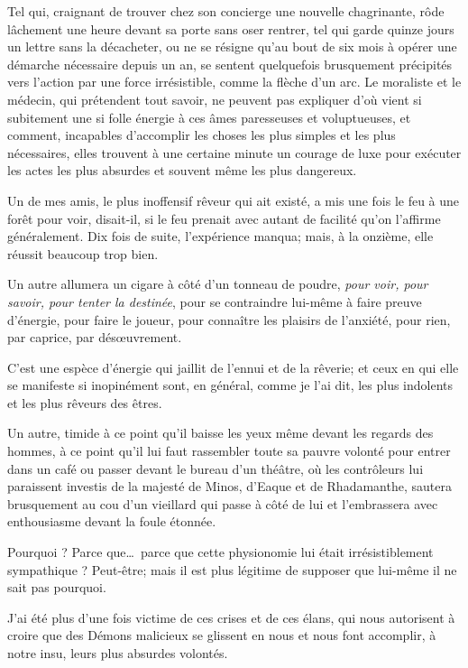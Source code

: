 Tel qui, craignant de trouver chez son concierge une nouvelle
chagrinante, rôde lâchement une heure devant sa porte sans oser
rentrer, tel qui garde quinze jours un lettre sans la décacheter, ou ne
se résigne qu’au bout de six mois à opérer une
démarche nécessaire depuis un an, se sentent quelquefois brusquement
précipités vers l’action par une force irrésistible,
comme la flèche d’un arc. Le moraliste et le médecin,
qui prétendent tout savoir, ne peuvent pas expliquer
d’où vient si subitement une si folle énergie à ces
âmes paresseuses et voluptueuses, et comment, incapables
d’accomplir les choses les plus simples et les plus
nécessaires, elles trouvent à une certaine minute un courage de luxe
pour exécuter les actes les plus absurdes et souvent même les plus
dangereux.

Un de mes amis, le plus inoffensif rêveur qui ait existé, a mis une fois
le feu à une forêt pour voir, disait{}-il, si le feu prenait avec
autant de facilité qu’on l’affirme
généralement. Dix fois de suite, l’expérience manqua;
mais, à la onzième, elle réussit beaucoup trop bien.

Un autre allumera un cigare à côté d’un tonneau de
poudre, \textit{pour voir, pour savoir, pour tenter la destinée}, pour se
contraindre lui{}-même à faire preuve d’énergie, pour
faire le joueur, pour connaître les plaisirs de
l’anxiété, pour rien, par caprice, par dés\oe uvrement.

C’est une espèce d’énergie qui jaillit
de l’ennui et de la rêverie; et ceux en qui elle se
manifeste si inopinément sont, en général, comme je
l’ai dit, les plus indolents et les plus rêveurs des
êtres.

Un autre, timide à ce point qu’il baisse les yeux même
devant les regards des hommes, à ce point qu’il lui
faut rassembler toute sa pauvre volonté pour entrer dans un café ou
passer devant le bureau d’un théâtre, où les
contrôleurs lui paraissent investis de la majesté de Minos,
d’Eaque et de Rhadamanthe, sautera brusquement au cou
d’un vieillard qui passe à côté de lui et
l’embrassera avec enthousiasme devant la foule
étonnée.

Pourquoi ? Parce que\ldots\ parce que cette physionomie lui était
irrésistiblement sympathique ? Peut{}-être; mais il est plus légitime
de supposer que lui{}-même il ne sait pas pourquoi.

J’ai été plus d’une fois victime de
ces crises et de ces élans, qui nous autorisent à croire que des Démons
malicieux se glissent en nous et nous font accomplir, à notre insu,
leurs plus absurdes volontés.

